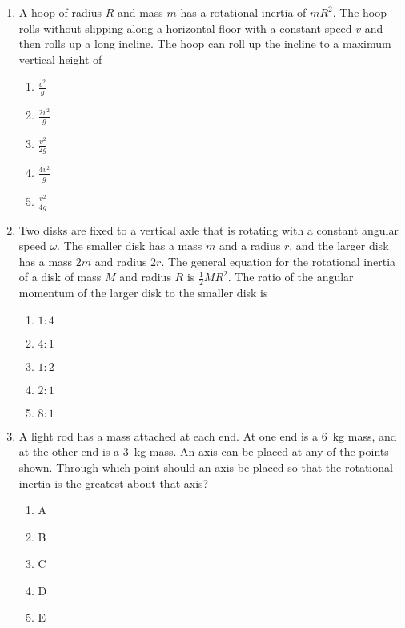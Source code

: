 \documentclass{../../oss-apphys}
\begin{document}
\begin{multicols}{2}
\begin{enumerate}[leftmargin=18pt]
  \item A hoop of radius $R$ and mass $m$ has a rotational inertia of $mR^2$. The
    hoop rolls without slipping along a horizontal floor with a constant
    speed $v$ and then rolls up a long incline. The hoop can roll up the
    incline to a maximum vertical height of
    \begin{center}
    \end{center}
    \begin{enumerate}[noitemsep,topsep=0pt]
    \item$\displaystyle \frac{v^2}{g}$
    \item$\displaystyle \frac{2v^2}{g}$
    \item$\displaystyle \frac{v^2}{2g}$
    \item$\displaystyle \frac{4v^2}{g}$
      \item$\displaystyle \frac{v^2}{4g}$
    \end{enumerate}

    
  \item Two disks are fixed to a vertical axle that is rotating with a constant
    angular speed $\omega$. The smaller disk has a mass $m$ and a radius $r$,
    and
    the larger disk has a mass $2m$ and radius $2r$. The general equation for the
    rotational inertia of a disk of mass $M$ and radius $R$ is $\frac{1}{2}MR^2$.
    The ratio of the angular momentum of the larger disk to the smaller disk is
    \begin{center}
    \end{center}
    \begin{enumerate}[noitemsep,topsep=0pt]
    \item$1:4$
    \item$4:1$
    \item$1:2$
    \item$2:1$
    \item$8:1$
    \end{enumerate}
    \columnbreak
    
  \item A light rod has a mass attached at each end. At one end is a \SI{6}{\kg}
    mass, and at the other end is a \SI{3}{\kg} mass. An axis can be placed at
    any of the points shown. Through which point should an axis be placed so that
    the rotational inertia is the greatest about that axis?
    \begin{center}
    \end{center}
    \begin{enumerate}[noitemsep,topsep=0pt]
    \item A
    \item B
    \item C
    \item D
    \item E
    \end{enumerate}
    

\end{enumerate}
\end{multicols}
\end{document}
